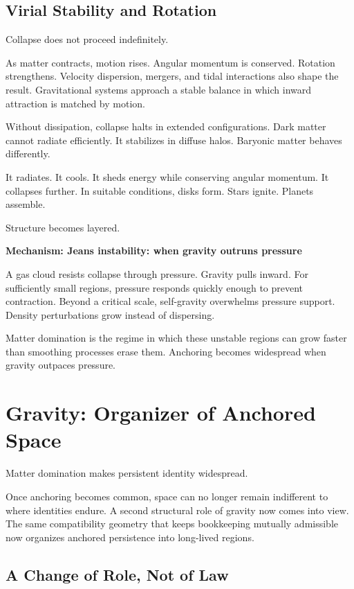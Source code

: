 \documentclass[11pt,twoside,openright]{book}
\newenvironment{mechanismbox}[1]
  {\begin{framed}\noindent\textbf{Mechanism: #1}\par\medskip}
  {\end{framed}}
\begin{document}
\section*{Virial Stability and Rotation}

Collapse does not proceed indefinitely.

As matter contracts, motion rises. Angular momentum is conserved. Rotation strengthens. Velocity dispersion, mergers, and tidal interactions also shape the result. Gravitational systems approach a stable balance in which inward attraction is matched by motion.

Without dissipation, collapse halts in extended configurations. Dark matter cannot radiate efficiently. It stabilizes in diffuse halos. Baryonic matter behaves differently.

It radiates. It cools. It sheds energy while conserving angular momentum. It collapses further. In suitable conditions, disks form. Stars ignite. Planets assemble.

Structure becomes layered.

\begin{mechanismbox}{Jeans instability: when gravity outruns pressure}

A gas cloud resists collapse through pressure. Gravity pulls inward. For sufficiently small regions, pressure responds quickly enough to prevent contraction. Beyond a critical scale, self-gravity overwhelms pressure support. Density perturbations grow instead of dispersing.

Matter domination is the regime in which these unstable regions can grow faster than smoothing processes erase them. Anchoring becomes widespread when gravity outpaces pressure.

\end{mechanismbox}
\chapter{Gravity: Organizer of Anchored Space}

Matter domination makes persistent identity widespread.

Once anchoring becomes common, space can no longer remain indifferent to where identities endure. A second structural role of gravity now comes into view. The same compatibility geometry that keeps bookkeeping mutually admissible now organizes anchored persistence into long-lived regions.

\section*{A Change of Role, Not of Law}
\end{document}

